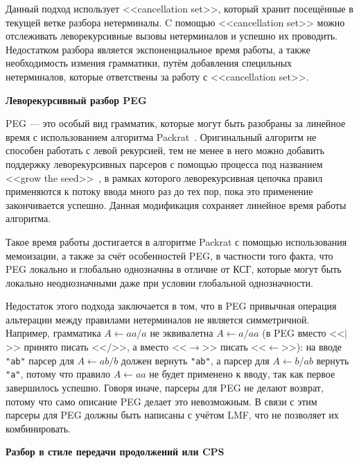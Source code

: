 \documentclass[times]{itmo-student-thesis}
\begin{document}
Данный подход использует <<cancellation set>>, который хранит посещённые в текущей ветке разбора нетерминалы. C помощью <<cancellation set>>
можно отслеживать леворекурсивные вызовы нетерминалов и успешно их проводить. Недостатком разбора является экспоненциальное время работы,
а также необходимость измения грамматики, путём добавления специльных нетерминалов, которые ответствены за работу с <<cancellation set>>.

\textbf{Леворекурсивный разбор PEG}~\cite{warth_packrat_2008}

PEG --- это особый вид грамматик, которые могут быть разобраны за линейное время с использованием алгоритма
Packrat~\cite{ford_parsing_2004}. Оригинальный алгоритм не способен работать с левой рекурсией, тем не менее в него можно
добавить поддержку леворекурсивных парсеров с помощью процесса под названием <<grow the seed>>~\cite{warth_packrat_2008}, в
рамках которого леворекурсивная цепочка правил применяются к потоку ввода много раз до тех пор, пока это применение
закончивается успешно. Данная модификация сохраняет линейное время работы алгоритма. 

Такое время работы достигается в алгоритме Packrat с помощью использования мемоизации, а также за счёт особенностей
PEG, в частности того факта, что PEG локально и глобально однозначны в отличие от КСГ, которые могут быть локально
неоднозначными даже при условии глобальной однозначности.

Недостаток этого подхода заключается в том, что в PEG привычная операция альтерации между правилами нетерминалов не
является симметричной. Например, грамматика $A \leftarrow aa / a$ не эквивалетна $A \leftarrow a / aa$ (в PEG вместо
<<$|$>>{} принято писать <<$/$>>{}, а вместо <<$\to$>>{} писать <<$\leftarrow$>>):
на вводе \lstinline{"ab"} парсер для $A \leftarrow ab / b$ должен вернуть \lstinline{"ab"}, а парсер для
$A \leftarrow b / ab$ вернуть \lstinline{"a"}, потому что правило $A \leftarrow aa$ не будет применено к вводу,
так как первое завершилось успешно. Говоря иначе, парсеры для PEG не делают возврат, потому что само описание PEG делает
это невозможным. В связи с этим парсеры для PEG должны быть написаны с учётом LMF, что не позволяет их
комбинировать.

\textbf{Разбор в стиле передачи продолжений или CPS}~\cite{johnson_memoization_1995}
\end{document}
